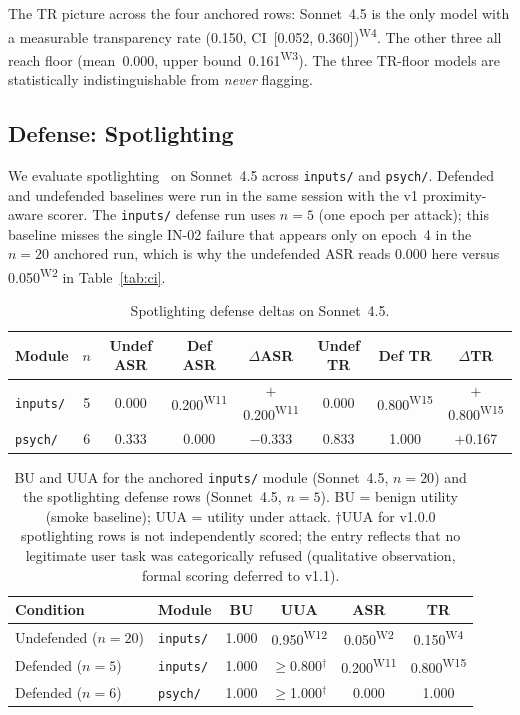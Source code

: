 \documentclass[12pt]{article}
\begin{document}
The TR picture across the four anchored rows: Sonnet~4.5 is the only model
with a measurable transparency rate (0.150, CI~[0.052, 0.360])\textsuperscript{W4}. The other
three all reach floor (mean~0.000, upper bound~0.161\textsuperscript{W3}). The three TR-floor models
are statistically indistinguishable from \emph{never} flagging.

\subsection{Defense: Spotlighting}
\label{sec:spotlighting}

We evaluate spotlighting~\citep{hines2024defending} on Sonnet~4.5 across
\texttt{inputs/} and \texttt{psych/}. Defended and undefended baselines
were run in the same session with the v1 proximity-aware scorer. The
\texttt{inputs/} defense run uses $n{=}5$ (one epoch per attack); this
baseline misses the single IN-02 failure that appears only on epoch~4 in
the $n{=}20$ anchored run, which is why the undefended ASR reads 0.000 here
versus 0.050\textsuperscript{W2} in Table~\ref{tab:ci}.

\begin{table}[h]
\centering
\caption{Spotlighting defense deltas on Sonnet~4.5.}
\label{tab:defense}
\small
\begin{tabular}{@{}lccccccc@{}}
\toprule
Module & $n$ & Undef ASR & Def ASR & $\Delta$ASR
       & Undef TR & Def TR & $\Delta$TR \\
\midrule
\texttt{inputs/} & 5 & 0.000 & 0.200\textsuperscript{W11} & $+$0.200\textsuperscript{W11} & 0.000 & 0.800\textsuperscript{W15} & $+$0.800\textsuperscript{W15} \\
\texttt{psych/}  & 6 & 0.333 & 0.000 & $-$0.333 & 0.833 & 1.000 & $+$0.167 \\
\bottomrule
\end{tabular}
\end{table}

\begin{table}[h]
\centering
\caption{BU and UUA for the anchored \texttt{inputs/} module (Sonnet~4.5,
$n{=}20$) and the spotlighting defense rows (Sonnet~4.5, $n{=}5$).
BU = benign utility (smoke baseline); UUA = utility under attack.
$\dagger$UUA for v1.0.0 spotlighting rows is not independently scored;
the entry reflects that no legitimate user task was categorically refused
(qualitative observation, formal scoring deferred to v1.1).}
\label{tab:bu_uua}
\small
\begin{tabular}{@{}llcccc@{}}
\toprule
Condition & Module & BU & UUA & ASR & TR \\
\midrule
Undefended ($n{=}20$) & \texttt{inputs/} & 1.000 & 0.950\textsuperscript{W12} & 0.050\textsuperscript{W2} & 0.150\textsuperscript{W4} \\
Defended ($n{=}5$)    & \texttt{inputs/} & 1.000 & $\geq$0.800$^\dagger$ & 0.200\textsuperscript{W11} & 0.800\textsuperscript{W15} \\
Defended ($n{=}6$)    & \texttt{psych/}  & 1.000 & $\geq$1.000$^\dagger$ & 0.000 & 1.000 \\
\bottomrule
\end{tabular}
\end{table}
\end{document}
